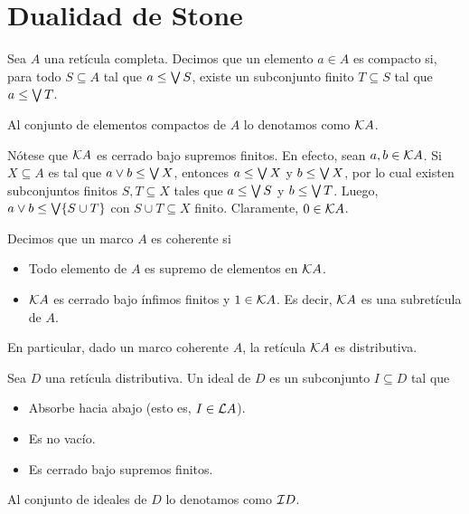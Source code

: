 \section{Dualidad de Stone}

\begin{defn}
    Sea $A$ una retícula completa.
    Decimos que un elemento $a\in A$ es compacto si,
    para todo $S\subseteq A$ tal que $a\leq\Sup S$,
    existe un subconjunto finito $T\subseteq S$ tal que
    $a\leq\Sup T$.
    
    Al conjunto de elementos compactos
    de $A$ lo denotamos como $\cal KA$.
\end{defn}

Nótese que $\cal KA$ es cerrado bajo supremos finitos.
En efecto, sean $a,b\in\cal KA$.
Si $X\subseteq A$ es tal que $a\sup b\leq\Sup X$,
entonces $a\leq\Sup X$ y $b\leq\Sup X$, por lo cual
existen subconjuntos finitos $S,T\subseteq X$
tales que $a\leq\Sup S$ y $b\leq\Sup T$.
Luego, $a\sup b\leq\Sup\{S\cup T\}$ con $S\cup T\subseteq X$ finito.
Claramente, $0\in\cal KA$.

\begin{defn}
    Decimos que un marco $A$ es coherente si
    \begin{itemize}
        \item Todo elemento de $A$ es supremo de elementos
        en $\cal KA$.
        \item $\cal KA$ es cerrado bajo ínfimos finitos
        y $1\in\cal KA$.
        Es decir, $\cal KA$ es una subretícula de $A$.
    \end{itemize}
    En particular, dado un marco coherente $A$, la retícula
    $\cal KA$ es distributiva.
\end{defn}

\begin{defn}
    Sea $D$ una retícula distributiva.
    Un ideal de $D$ es un subconjunto $I\subseteq D$ tal que
    \begin{itemize}
        \item Absorbe hacia abajo (esto es, $I\in\cal LA$).
        \item Es no vacío.
        \item Es cerrado bajo supremos finitos.
    \end{itemize}
    Al conjunto de ideales de $D$ lo denotamos como $\cal ID$.
\end{defn}

